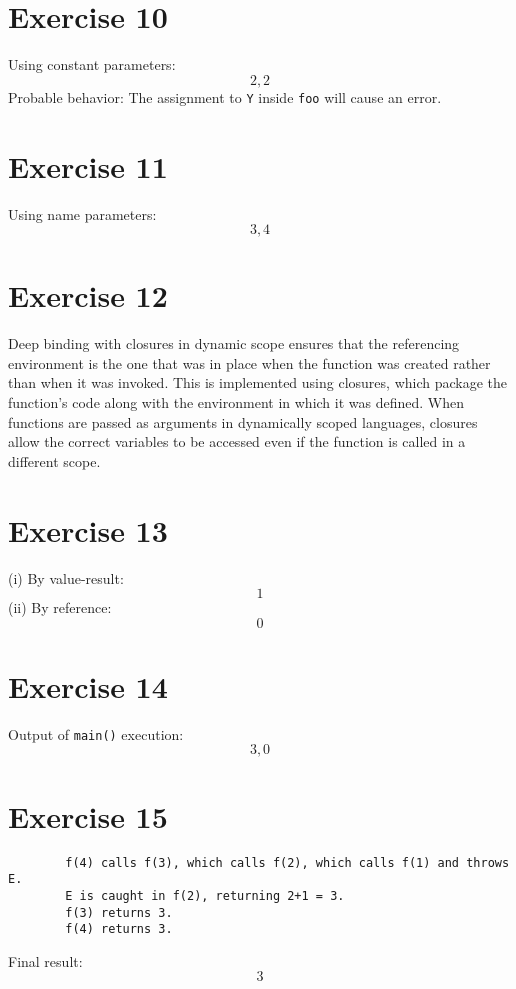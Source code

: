 \documentclass[12pt]{article}
\begin{document}
	\section*{Exercise 10}
	Using constant parameters:
	\[ \boxed{2, 2} \]
	Probable behavior: The assignment to \texttt{Y} inside \texttt{foo} will cause an error.
	
	\section*{Exercise 11}
	Using name parameters:
	\[ \boxed{3, 4} \]
	
	\section*{Exercise 12}
	Deep binding with closures in dynamic scope ensures that the referencing environment is the one that was in place when the function was created rather than when it was invoked. This is implemented using closures, which package the function's code along with the environment in which it was defined. When functions are passed as arguments in dynamically scoped languages, closures allow the correct variables to be accessed even if the function is called in a different scope.
	
	\section*{Exercise 13}
	(i) By value-result:
	\[ \boxed{1} \]
	(ii) By reference:
	\[ \boxed{0} \]
	
	\section*{Exercise 14}
	Output of \texttt{main()} execution:
	\[ \boxed{3, 0} \]
	
	\section*{Exercise 15}
	\begin{verbatim}
		f(4) calls f(3), which calls f(2), which calls f(1) and throws E.
		E is caught in f(2), returning 2+1 = 3.
		f(3) returns 3.
		f(4) returns 3.
	\end{verbatim}
	Final result: \[ \boxed{3} \]
	
\end{document}
